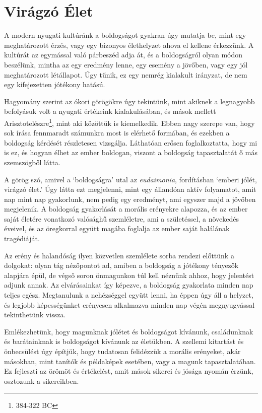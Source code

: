 \section{Virágzó Élet}

A modern nyugati kultúránk a boldogságot gyakran úgy mutatja be, mint
egy meghatározott érzés, vagy egy bizonyos élethelyzet ahova el kellene
érkezzünk. A kultúrát az egymással való párbeszéd adja át, és a
boldogságról olyan módon beszélünk, mintha az egy eredmény lenne, egy
esemény a jövőben, vagy egy jól meghatározott létállapot. Úgy tűnik, ez
egy nemrég kialakult irányzat, de nem egy kifejezetten jótékony hatású.

Hagyomány szerint az ókori görögökre úgy tekintünk, mint akiknek a
legnagyobb befolyásuk volt a nyugati értékeink kialakulásában, és mások
mellett Arisztotelészre\footnote{384-322 BC}, mint aki közöttük is
kiemelkedik. Ebben nagy szerepe van, hogy sok írása fennmaradt számunkra
most is elérhető formában, és ezekben a boldogság kérdését részletesen
vizsgálja. Láthatóan erősen foglalkoztatta, hogy mi is ez, és hogyan
élhet az ember boldogan, viszont a boldogság tapasztalatát ő más
szemszögből látta.

A görög szó, amivel a `boldogságra' utal az \emph{eudaimonia},
fordításban `emberi jólét, virágzó élet.' Úgy látta ezt megjelenni, mint
egy állandóan aktív folyamatot, amit nap mint nap gyakorlunk, nem pedig
egy eredményt, ami egyszer majd a jövőben megjelenik. A boldogság
gyakorlását a morális erényekre alapozza, és az ember saját életére
vonatkozó valósághű szemléletre, ami a születéssel, a növekedés éveivel,
és az öregkorral együtt magába foglalja az ember saját halálának
tragédiáját.

Az erény és halandóság ilyen közvetlen szemlélete sorba rendezi előttünk
a dolgokat: olyan tág nézőpontot ad, amiben a boldogság a jótékony
tényezők alapjára épül, de végső soron önmagunkon túl kell néznünk
ahhoz, hogy jelentést adjunk annak. Az elvárásainkat így képezve, a
boldogság gyakorlata minden nap teljes egész. Megtanulunk a nehézséggel
együtt lenni, ha éppen úgy áll a helyzet, és legjobb képességünket
erényesen alkalmazva minden nap végén megnyugvással tekinthetünk vissza.

Emlékezhetünk, hogy magunknak jólétet és boldogságot kívánunk,
családunknak és barátainknak is boldogságot kívánunk az életükben. A
szellemi kitartást és önbecsülést úgy építjük, hogy tudatosan felidézzük
a morális erényeket, akár másokban, mint tanítók és példaképek esetében,
vagy a magunk tapasztalatában. Ez fejleszti az örömöt és értékelést,
amit mások sikerei és jósága nyomán érzünk, osztozunk a sikereikben.

